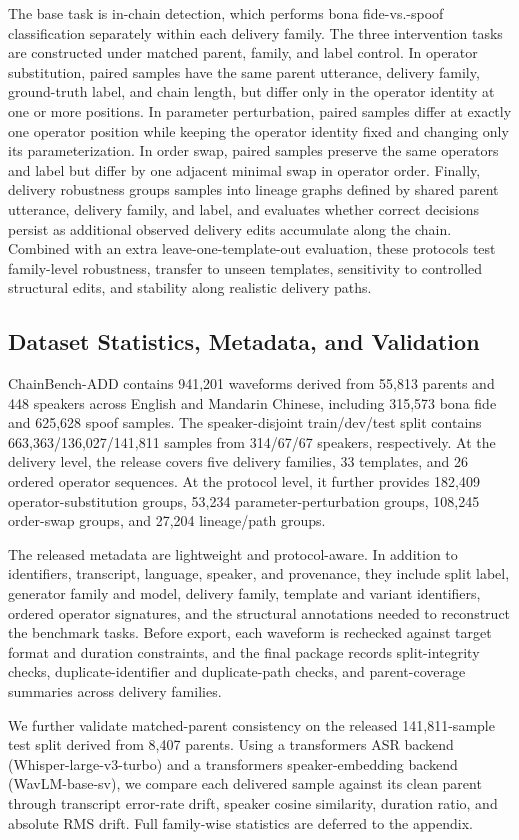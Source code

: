 The base task is in-chain detection, which performs bona fide-vs.-spoof classification separately within each delivery family. The three intervention tasks are constructed under matched parent, family, and label control. In operator substitution, paired samples have the same parent utterance, delivery family, ground-truth label, and chain length, but differ only in the operator identity at one or more positions. In parameter perturbation, paired samples differ at exactly one operator position while keeping the operator identity fixed and changing only its parameterization. In order swap, paired samples preserve the same operators and label but differ by one adjacent minimal swap in operator order. Finally, delivery robustness groups samples into lineage graphs defined by shared parent utterance, delivery family, and label, and evaluates whether correct decisions persist as additional observed delivery edits accumulate along the chain. Combined with an extra leave-one-template-out evaluation, these protocols test family-level robustness, transfer to unseen templates, sensitivity to controlled structural edits, and stability along realistic delivery paths.

\subsection{Dataset Statistics, Metadata, and Validation}
ChainBench-ADD contains 941,201 waveforms derived from 55,813 parents and 448 speakers across English and Mandarin Chinese, including 315,573 bona fide and 625,628 spoof samples. The speaker-disjoint train/dev/test split contains 663,363/136,027/141,811 samples from 314/67/67 speakers, respectively. At the delivery level, the release covers five delivery families, 33 templates, and 26 ordered operator sequences. At the protocol level, it further provides 182,409 operator-substitution groups, 53,234 parameter-perturbation groups, 108,245 order-swap groups, and 27,204 lineage/path groups.

The released metadata are lightweight and protocol-aware. In addition to identifiers, transcript, language, speaker, and provenance, they include split label, generator family and model, delivery family, template and variant identifiers, ordered operator signatures, and the structural annotations needed to reconstruct the benchmark tasks. Before export, each waveform is rechecked against target format and duration constraints, and the final package records split-integrity checks, duplicate-identifier and duplicate-path checks, and parent-coverage summaries across delivery families.

We further validate matched-parent consistency on the released 141,811-sample test split derived from 8,407 parents. Using a transformers ASR backend (Whisper-large-v3-turbo) and a transformers speaker-embedding backend (WavLM-base-sv), we compare each delivered sample against its clean parent through transcript error-rate drift, speaker cosine similarity, duration ratio, and absolute RMS drift. Full family-wise statistics are deferred to the appendix.